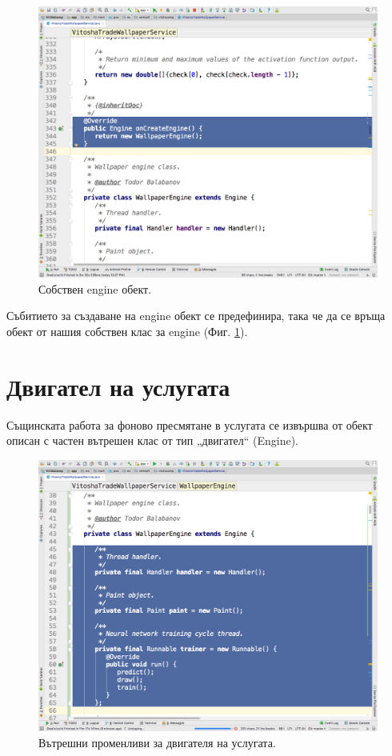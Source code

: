 \documentclass[book,14pt,oneside,openany]{memoir}
\begin{document}
\begin{figure}[h]
  \centering
  \includegraphics[height=0.45\pdfpageheight]{pic0045}
  \caption{Собствен engine обект.}
\label{fig:pic0045}
\end{figure}
\FloatBarrier

Събитието за създаване на engine обект се предефинира, така че да се връща обект от нашия собствен клас за engine (Фиг. \ref{fig:pic0045}). 

\section{Двигател на услугата}

Същинската работа за фоново пресмятане в услугата се извършва от обект описан с частен вътрешен клас от тип „двигател“ (Engine).

\begin{figure}[h]
  \centering
  \includegraphics[height=0.45\pdfpageheight]{pic0046}
  \caption{Вътрешни променливи за двигателя на услугата.}
\label{fig:pic0046}
\end{figure}
\FloatBarrier
\end{document}
